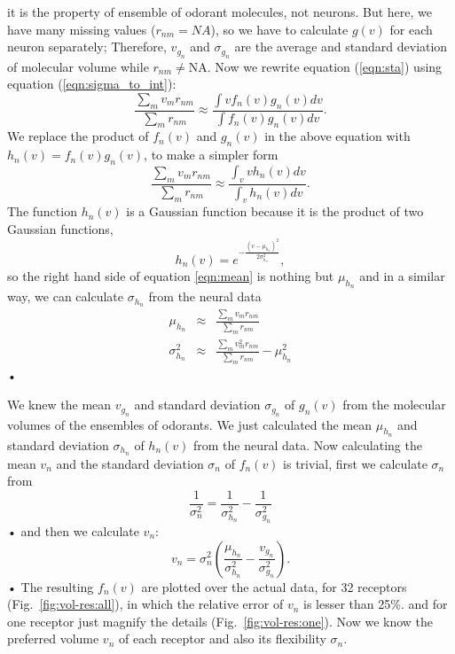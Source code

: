 \documentclass[11pt]{paper} %
\newcommand{\numberofreceptors}{32 }
\begin{document}
it is the property of ensemble of odorant molecules, not neurons. 
But here, we have many missing values ($r_{nm} = NA$), 
so we have to calculate $g(v)$ for each neuron separately; 
Therefore, $v_{g_n}$ and $\sigma_{g_n}$ are the average and standard deviation of molecular volume while $r_{nm} \neq \text{NA}$.
Now we rewrite equation (\ref{eqn:sta}) using equation (\ref{eqn:sigma_to_int}):
\begin{equation}
	\frac{\displaystyle \sum_{m} v_m r_{nm}}{\displaystyle \sum_{m} r_{nm}} \approx \frac{\displaystyle \int v f_n(v) g_n(v) dv}{\displaystyle \int f_n(v) g_n(v) dv}.
	\label{eqn:sta_int}
\end{equation}
We replace the product of $f_n(v)$ and $g_n(v)$ in the above equation with $h_n(v) = f_n(v) g_n(v)$, to make a simpler form
\begin{equation}
	\frac{\displaystyle \sum_{m} v_m r_{nm}}{\displaystyle \sum_{m} r_{nm}} \approx \frac{\displaystyle \int_v v h_n(v) dv}{ \displaystyle \int_v  h_n(v) dv }.
	\label{eqn:mean}
\end{equation}
The function $h_n(v)$ is a Gaussian function because it is the product of two Gaussian functions, 
\begin{equation}
h_n(v) = e^{-\frac{(v-\mu_{h_n})^2}{2\sigma_{h_n}^2}}, 
\end{equation}
so the right hand side of equation \ref{eqn:mean} is nothing but $\mu_{h_n}$ and 
in a similar way, we can calculate $\sigma_{h_n}$ from the neural data
\begin{eqnarray}
	\mu_{h_n} &\approx& \frac{\displaystyle \sum_{m} v_m r_{nm}}{\displaystyle \sum_{m} r_{nm}} \\
	\sigma_{h_n}^2 &\approx& \frac{\displaystyle \sum_{m} v_m^2 r_{nm}}{\displaystyle \sum_{m} r_{nm}} - \mu_{h_n}^2
	\label{eqn:final_h}
\end{eqnarray}•


We knew the mean $v_{g_n}$ and standard deviation $\sigma_{g_n}$ of $g_n(v)$ from the molecular volumes of the ensembles of odorants. 
We just calculated the mean $\mu_{h_n}$ and standard deviation $\sigma_{h_n}$ of $h_n(v)$ from the neural data.
Now calculating the mean $v_n$ and the standard deviation $\sigma_n$ of $f_n(v)$ is trivial,
first we calculate $\sigma_n$ from 
\begin{equation}
	\frac{1}{\sigma_n^2} = \frac{1}{\sigma^2_{h_n}}  - \frac{1}{\sigma^2_{g_n}}
\end{equation}•
and then we calculate $v_n$: 
\begin{equation}
	v_n =  \sigma_n^2 \left ( \frac{\mu_{h_n}}{\sigma^2_{h_n}} - \frac{v_{g_n}}{\sigma^2_{g_n}} \right ).
\end{equation}•
The resulting $f_n(v)$ are plotted over the actual data, for \numberofreceptors receptors (Fig.~\ref{fig:vol-res:all}), 
in which the relative error of $v_n$ is lesser than 25\%.	
and for one receptor just magnify the details (Fig.~\ref{fig:vol-res:one}).
Now we know the preferred volume $v_n$ of each receptor and also its flexibility $\sigma_n$.
\end{document}
